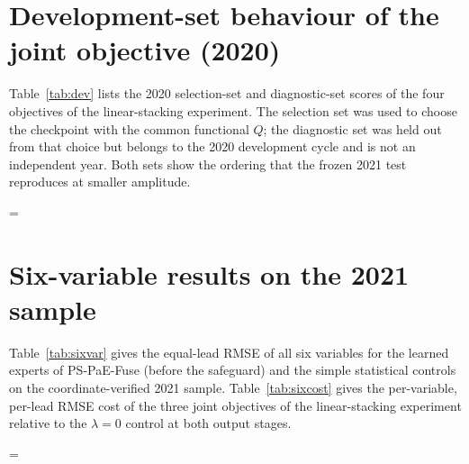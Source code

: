 \documentclass[12pt]{article}
\newcommand{\fitTable}[1]{\begingroup\linespread{1}\selectfont\setbox0=\hbox{#1}\ifdim\wd0>\linewidth\setbox0=\hbox{\resizebox{\linewidth}{!}{\box0}}\fi\ifdim\dimexpr\ht0+\dp0\relax>.68\textheight\resizebox*{!}{.68\textheight}{\box0}\else\box0\fi\endgroup}
\begin{document}
\clearpage
\section{Development-set behaviour of the joint objective (2020)}

Table~\ref{tab:dev} lists the 2020 selection-set and diagnostic-set scores of the four objectives of the linear-stacking experiment. The selection set was used to choose the checkpoint with the common functional $Q$; the diagnostic set was held out from that choice but belongs to the 2020 development cycle and is not an independent year. Both sets show the ordering that the frozen 2021 test reproduces at smaller amplitude.

\begin{table}[h!]
\caption{Development scores of the linear-stacking objective experiment on the 2020 selection set (36 dates) and diagnostic set (28 dates), three-seed means with the sample standard deviation over seeds in parentheses for CSI$_{20}$.}
\label{tab:dev}
\vspace*{2mm}
\centering
{\linespread{1.0}\selectfont\small
\fitTable{}}
\end{table}

\clearpage
\section{Six-variable results on the 2021 sample}

Table~\ref{tab:sixvar} gives the equal-lead RMSE of all six variables for the learned experts of PS-PaE-Fuse (before the safeguard) and the simple statistical controls on the coordinate-verified 2021 sample. Table~\ref{tab:sixcost} gives the per-variable, per-lead RMSE cost of the three joint objectives of the linear-stacking experiment relative to the $\lambda=0$ control at both output stages.

\begin{table}[h!]
\caption{Equal-lead RMSE over the 22 initialization dates of 2021 for the four members, four simple combinations, the global-skill expert and PS-PaE-Fuse without the safeguard for the three frozen router seeds. Z500 is geopotential in m$^{2}$ s$^{-2}$. Upper-air values use the coordinate-verified ERA5 reference.}
\label{tab:sixvar}
\vspace*{2mm}
\centering
{\linespread{1.0}\selectfont\footnotesize
\fitTable{}}
\end{table}
\end{document}
